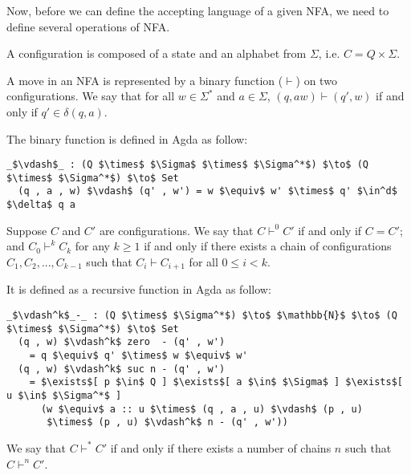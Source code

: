 \par Now, before we can define the accepting language of a given
NFA, we need to define several operations of NFA. 

\begin{defn}
\noindent A configuration is composed of a state and an alphabet from
\(\Sigma\), i.e. \(C = Q \times \Sigma\). 
\end{defn}

\begin{defn}
\noindent A move in an NFA is
represented by a binary function (\(\vdash\)) on two configurations. We say
that for all \(w \in \Sigma^*\) and \(a \in \Sigma\), \((q, aw)
\vdash (q' , w)\) if and only if \(q' \in \delta (q , a)\). 
\end{defn}

\par The binary function is defined in Agda as follow: 
\begin{lstlisting}[mathescape=true,xleftmargin=.1\textwidth]
  _$\vdash$_ : (Q $\times$ $\Sigma$ $\times$ $\Sigma^*$) $\to$ (Q $\times$ $\Sigma^*$) $\to$ Set
  (q , a , w) $\vdash$ (q' , w') = w $\equiv$ w' $\times$ q' $\in^d$ $\delta$ q a
\end{lstlisting}

\begin{defn}
\noindent Suppose \(C\) and \(C'\) are configurations. We say that \(C \vdash^0 C'\) if and only
if \(C = C'\); and \(C_0 \vdash^k C_k\) for any \(k \geq 1\) if and only if there exists a chain of
configurations \(C_1, C_2, ..., C_{k-1}\) such that \(C_i \vdash C_{i+1}\) for all \(0 \leq i < k\). 
\end{defn}

\par It is defined as a recursive function in Agda as follow: 
\begin{lstlisting}[mathescape=true,xleftmargin=.1\textwidth]
  _$\vdash^k$_-_ : (Q $\times$ $\Sigma^*$) $\to$ $\mathbb{N}$ $\to$ (Q $\times$ $\Sigma^*$) $\to$ Set
  (q , w) $\vdash^k$ zero  - (q' , w')
    = q $\equiv$ q' $\times$ w $\equiv$ w'
  (q , w) $\vdash^k$ suc n - (q' , w') 
    = $\exists$[ p $\in$ Q ] $\exists$[ a $\in$ $\Sigma$ ] $\exists$[ u $\in$ $\Sigma^*$ ]
      (w $\equiv$ a :: u $\times$ (q , a , u) $\vdash$ (p , u) 
       $\times$ (p , u) $\vdash^k$ n - (q' , w'))
\end{lstlisting}

\begin{defn}
\noindent We say that \(C \vdash^* C'\) if and only
if there exists a number of chains \(n\) such that \(C \vdash^n C'\). 
\end{defn}

